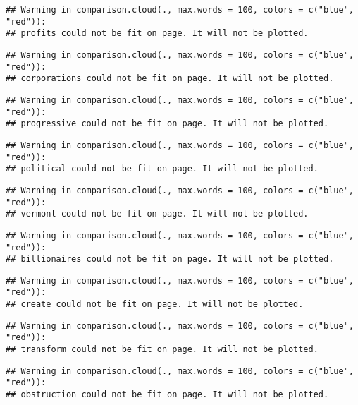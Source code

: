 \documentclass[]{article}
\begin{document}
\begin{verbatim}
## Warning in comparison.cloud(., max.words = 100, colors = c("blue", "red")):
## profits could not be fit on page. It will not be plotted.
\end{verbatim}

\begin{verbatim}
## Warning in comparison.cloud(., max.words = 100, colors = c("blue", "red")):
## corporations could not be fit on page. It will not be plotted.
\end{verbatim}

\begin{verbatim}
## Warning in comparison.cloud(., max.words = 100, colors = c("blue", "red")):
## progressive could not be fit on page. It will not be plotted.
\end{verbatim}

\begin{verbatim}
## Warning in comparison.cloud(., max.words = 100, colors = c("blue", "red")):
## political could not be fit on page. It will not be plotted.
\end{verbatim}

\begin{verbatim}
## Warning in comparison.cloud(., max.words = 100, colors = c("blue", "red")):
## vermont could not be fit on page. It will not be plotted.
\end{verbatim}

\begin{verbatim}
## Warning in comparison.cloud(., max.words = 100, colors = c("blue", "red")):
## billionaires could not be fit on page. It will not be plotted.
\end{verbatim}

\begin{verbatim}
## Warning in comparison.cloud(., max.words = 100, colors = c("blue", "red")):
## create could not be fit on page. It will not be plotted.
\end{verbatim}

\begin{verbatim}
## Warning in comparison.cloud(., max.words = 100, colors = c("blue", "red")):
## transform could not be fit on page. It will not be plotted.
\end{verbatim}

\begin{verbatim}
## Warning in comparison.cloud(., max.words = 100, colors = c("blue", "red")):
## obstruction could not be fit on page. It will not be plotted.
\end{verbatim}
\end{document}
